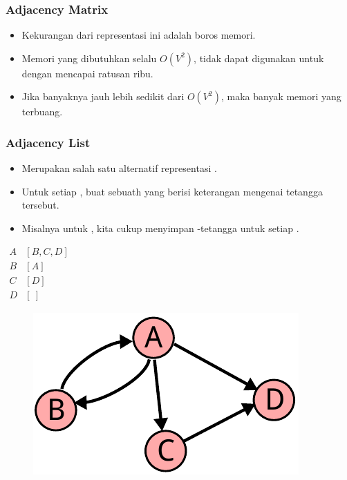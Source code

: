 \begin{frame}
\frametitle{Adjacency Matrix}
\begin{itemize}
  \item Kekurangan dari representasi ini adalah boros memori.
  \item Memori yang dibutuhkan selalu $O(V^2)$, tidak dapat digunakan untuk \fgraph dengan \fnode mencapai ratusan ribu.
  \item Jika banyaknya \fedge jauh lebih sedikit dari $O(V^2)$, maka banyak memori yang terbuang.
\end{itemize}
\end{frame}

\begin{frame}
\frametitle{Adjacency List}
\begin{itemize}
  \item Merupakan salah satu alternatif representasi \fgraph.
  \item Untuk setiap \fnode, buat sebuath \flist yang berisi keterangan mengenai tetangga \fnode tersebut.
  \item Misalnya untuk  \fgraph, kita cukup menyimpan \fnode-\fnode tetangga untuk setiap \fnode.
\end{itemize}
\begin{center}
\begin{multicols}{2}
  $\begin{array}{r|l}
    A & [B, C, D] \\
    B & [A] \\
    C & [D] \\
    D & [\ ]
  \end{array}$
  \break
  \begin{figure}
    \includegraphics[width=4 cm]{asset/unweighted-directed.pdf}
  \end{figure}
\end{multicols} 
\end{center}
\end{frame}


